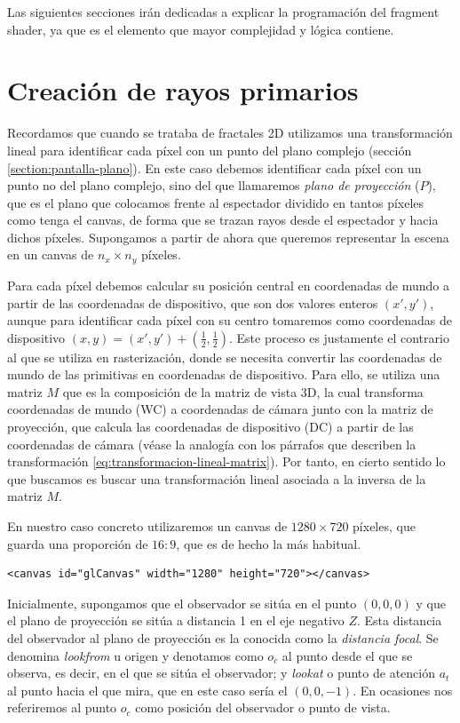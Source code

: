 Las siguientes secciones irán dedicadas a explicar la programación del fragment shader, ya que es el elemento que mayor complejidad y lógica contiene.

\section{Creación de rayos primarios}
\label{section:rayo}

Recordamos que cuando se trataba de fractales 2D utilizamos una transformación lineal para identificar cada píxel con un punto del plano complejo (sección \ref{section:pantalla-plano}). En este caso debemos identificar cada píxel con un punto no del plano complejo, sino del que llamaremos \textit{plano de proyección} ($P$), que es el plano que colocamos frente al espectador dividido en tantos píxeles como tenga el canvas, de forma que se trazan rayos desde el espectador y hacia dichos píxeles. Supongamos a partir de ahora que queremos representar la escena en un canvas de $n_x\times n_y$ píxeles.

Para cada píxel debemos calcular su posición central en coordenadas de mundo a partir de las coordenadas de dispositivo, que son dos valores enteros $(x',y')$, aunque para identificar cada píxel con su centro tomaremos como coordenadas de dispositivo $(x,y)=(x',y')+\left(\frac 1 2, \frac 1 2\right)$. Este proceso es justamente el contrario al que se utiliza en rasterización, donde se necesita convertir las coordenadas de mundo de las primitivas en coordenadas de dispositivo. Para ello, se utiliza una matriz $M$ que es la composición de la matriz de vista 3D, la cual transforma coordenadas de mundo (WC) a coordenadas de cámara junto con la matriz de proyección, que calcula las coordenadas de dispositivo (DC) a partir de las coordenadas de cámara (véase la analogía con los párrafos que describen la transformación \ref{eq:transformacion-lineal-matrix}). Por tanto, en cierto sentido lo que buscamos es buscar una transformación lineal asociada a la inversa de la matriz $M$.

En nuestro caso concreto utilizaremos un canvas de $1280\times 720$ píxeles, que guarda una proporción de $16:9$, que es de hecho la más habitual.

\begin{lstlisting}
<canvas id="glCanvas" width="1280" height="720"></canvas>
\end{lstlisting}

Inicialmente, supongamos que el observador se sitúa en el punto $(0,0,0)$ y que el plano de proyección se sitúa a distancia 1 en el eje negativo $Z$. Esta distancia del observador al plano de proyección es la conocida como la \textit{distancia focal}. Se denomina \textit{lookfrom} u origen y denotamos como $o_c$ al punto desde el que se observa, es decir, en el que se sitúa el observador; y \textit{lookat} o punto de atención $a_t$ al punto hacia el que mira, que en este caso sería el $(0,0,-1)$. En ocasiones nos referiremos al punto $o_c$ como posición del observador o punto de vista.

